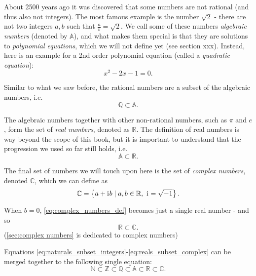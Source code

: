 About 2500 years ago it was discovered that some numbers are not rational (and thus also not integers). The most famous example is the number $\sqrt{2}$ - there are not two integers $a,b$ such that $\frac{a}{b}=\sqrt{2}$. We call some of these numbers \emph{algebraic numbers} (denoted by $\mathbb{A}$), and what makes them special is that they are solutions to \emph{polynomial equations}, which we will not define yet (see section xxx). Instead, here is an example for a 2nd order polynomial equation (called a \emph{quadratic equation}):
\begin{equation}
	x^{2} - 2x - 1 = 0.
	\label{eq:quadratic_equation}
\end{equation}

Similar to what we saw before, the rational numbers are a subset of the algebraic numbers, i.e.
\begin{equation}
	\mathbb{Q}\subset\mathbb{A}.
	\label{eq:rationals_subset_algebraic}
\end{equation}

The algebraic numbers together with other non-rational numbers, such as $\pi$ and $e$, form the set of \emph{real numbers}, denoted as $\mathbb{R}$. The definition of real numbers is way beyond the scope of this book, but it is important to understand that the progression we used so far still holds, i.e.
\begin{equation}
	\mathbb{A}\subset\mathbb{R}.
	\label{eq:algebraic_subset_reals}
\end{equation}

The final set of numbers we will touch upon here is the set of \emph{complex numbers}, denoted $\mathbb{C}$, which we can define as
\begin{equation}
	\mathbb{C} = \left\{ a+\mathrm{i}\mkern1mu b \mid a,b\in\mathbb{R},\ \mathrm{i}\mkern1mu=\sqrt{-1} \right\}.
	\label{eq:complex_numbers_def}
\end{equation}

When $b=0$, \autoref{eq:complex_numbers_def} becomes just a single real number - and so
\begin{equation}
	\mathbb{R}\subset\mathbb{C}.
	\label{eq:reals_subset_complex}
\end{equation}
(\autoref{sec:complex numbers} is dedicated to complex numbers)

Equations \ref{eq:naturals_subset_integers}-\ref{eq:reals_subset_complex} can be merged together to the following single equation:
\begin{equation}
	\mathbb{N} \subset \mathbb{Z} \subset \mathbb{Q} \subset \mathbb{A} \subset \mathbb{R} \subset \mathbb{C}.
	\label{eq:numbers_subsets}
\end{equation}

